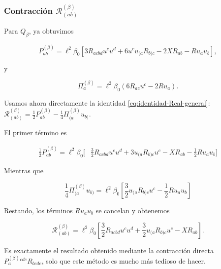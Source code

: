 \documentclass{beamer}
\newcommand{\Rcal}{\mathcal{R}}
\newcommand{\Eq}[1]{\eqref{#1}}
\newcommand{\CompactDisplaySpacing}{%
  \setlength{\abovedisplayskip}{2pt plus 1pt minus 1pt}%
  \setlength{\belowdisplayskip}{2pt plus 1pt minus 1pt}%
  \setlength{\abovedisplayshortskip}{0pt plus 1pt}%
  \setlength{\belowdisplayshortskip}{1pt plus 1pt}%
}
\begin{document}

\begin{frame}[label=nav-frame-109]
	\frametitle{Contracción \(\Rcal^{(\beta)}_{(ab)}\)}
	\scriptsize
	\CompactDisplaySpacing

	Para \(Q_\beta\), ya obtuvimos

	\[
	P^{(\beta)}_{ab}
	=
	\ell^2\beta_0
	\left[
	3R_{acbd}u^cu^d
	+
	6u^cu_{(a}R_{b)c}
	-
	2XR_{ab}
	-
	Ru_au_b
	\right],
	\]

	y

	\[
	\Pi^{(\beta)}_a
	=
	\ell^2\beta_0
	\left(
	6R_{ac}u^c
	-
	2Ru_a
	\right).
	\]


	Usamos ahora directamente la identidad \Eq{eq:identidad-Rcal-general}: $\Rcal^{(\beta)}_{(ab)} = \frac12P^{(\beta)}_{ab} - \frac14\Pi^{(\beta)}_{(a}u_{b)}$.

	El primer término es

	\begin{align*}
		\frac12P^{(\beta)}_{ab}
		=
		\ell^2\beta_0
		\Big[
		&
		\frac32R_{acbd}u^cu^d
		+
		3u_{(a}R_{b)c}u^c
		-XR_{ab}
		-\frac12Ru_au_b
		\Big]
	\end{align*}

	Mientras que

	\[
	\frac14\Pi^{(\beta)}_{(a}u_{b)}
	=
	\ell^2\beta_0
	\left[
	\frac32u_{(a}R_{b)c}u^c
	-
	\frac12Ru_au_b
	\right]
	\]


	Restando, los términos \(Ru_au_b\) se cancelan y obtenemos

	\begin{equation}
		\boxed{
			\Rcal^{(\beta)}_{(ab)}
			=
			\ell^2\beta_0
			\left[
			\frac32R_{acbd}u^cu^d
			+
			\frac32u_{(a}R_{b)c}u^c
			-
			XR_{ab}
			\right].
		}
		\label{eq:Rcalbeta-sim}
	\end{equation}

	Es exactamente el resultado obtenido mediante
	la contracción directa
	\(P^{(\beta)}_a{}^{cde}R_{bcde}\), solo que este método es mucho más tedioso de hacer.

\end{frame}
\end{document}
